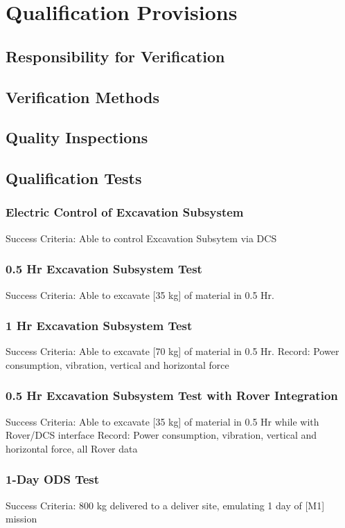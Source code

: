 \newpage
\section{Qualification Provisions}
\subsection{Responsibility for Verification}

\subsection{Verification Methods}

\subsection{Quality Inspections}

\subsection{Qualification Tests}
\subsubsection{Electric Control of Excavation Subsystem}
Success Criteria: Able to control Excavation Subsytem via DCS
\subsubsection{0.5 Hr Excavation Subsystem Test}
Success Criteria: Able to excavate [35 kg] of material in 0.5 Hr. 
\subsubsection{1 Hr Excavation Subsystem Test}
Success Criteria: Able to excavate [70 kg] of material in 0.5 Hr. 
Record: Power consumption, vibration, vertical and horizontal force
\subsubsection{0.5 Hr Excavation Subsystem Test with Rover Integration }
Success Criteria: Able to excavate [35 kg] of material in 0.5 Hr while with Rover/DCS interface
Record: Power consumption, vibration, vertical and horizontal force, all Rover data
\subsubsection{1-Day ODS Test}
Success Criteria: 800 kg delivered to a deliver site, emulating 1 day of [M1] mission
\newpage
